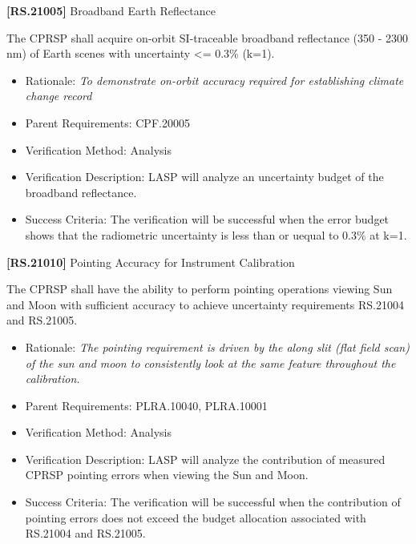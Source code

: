\textbf{[RS.21005]} Broadband Earth Reflectance

The \gls{CPRSP} shall acquire on-orbit \gls{SI}-traceable broadband reflectance (350 - 2300 nm) of Earth scenes with uncertainty <= 0.3\% (k=1).

\begin{itemize}
\item{} Rationale: \emph{To demonstrate on-orbit accuracy required for establishing climate change record}

\item{} Parent Requirements: \gls{CPF}.20005

\item{} Verification Method: Analysis

\item{} Verification Description: \gls{LASP} will analyze an uncertainty budget of the broadband reflectance.

\item{} Success Criteria: The verification will be successful when the error budget shows that the radiometric uncertainty is less than or uequal to 0.3\% at k=1.

\end{itemize}

\textbf{[RS.21010]} Pointing Accuracy for Instrument Calibration

The \gls{CPRSP} shall have the ability to perform \gls{point}ing operations viewing Sun and Moon with sufficient accuracy to achieve uncertainty requirements \gls{RS}.21004 and \gls{RS}.21005.

\begin{itemize}
\item{} Rationale: \emph{The pointing requirement is driven by the along slit (flat field scan) of the sun and moon to consistently look at the same feature throughout the calibration.}

\item{} Parent Requirements: PLRA.10040, PLRA.10001

\item{} Verification Method: Analysis

\item{} Verification Description: \gls{LASP} will analyze the contribution of \gls{measure}d \gls{CPRSP} \gls{point}ing errors when viewing the Sun and Moon.

\item{} Success Criteria: The verification will be successful when the contribution of \gls{point}ing errors does not exceed the budget allocation associated with \gls{RS}.21004 and \gls{RS}.21005.

\end{itemize}

